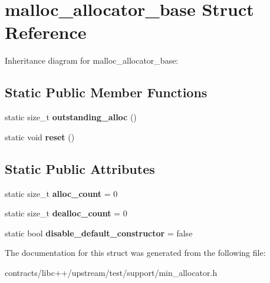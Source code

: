 \hypertarget{structmalloc__allocator__base}{}\section{malloc\+\_\+allocator\+\_\+base Struct Reference}
\label{structmalloc__allocator__base}


Inheritance diagram for malloc\+\_\+allocator\+\_\+base\+:
\subsection*{Static Public Member Functions}
\begin{DoxyCompactItemize}
\item 
\mbox{\label{structmalloc__allocator__base_a3427afcf9434416b9a1b515e244ca60f}} 
static size\+\_\+t {\bfseries outstanding\+\_\+alloc} ()
\item 
\mbox{\label{structmalloc__allocator__base_a7f3e6ab825b526a4f5fdb63b6d248fd3}} 
static void {\bfseries reset} ()
\end{DoxyCompactItemize}
\subsection*{Static Public Attributes}
\begin{DoxyCompactItemize}
\item 
\mbox{\label{structmalloc__allocator__base_afb84027cfe84072b009c13367ae7f69e}} 
static size\+\_\+t {\bfseries alloc\+\_\+count} = 0
\item 
\mbox{\label{structmalloc__allocator__base_a38f8564cc929bda224dcaa9dd87fe0d0}} 
static size\+\_\+t {\bfseries dealloc\+\_\+count} = 0
\item 
\mbox{\label{structmalloc__allocator__base_adc4ad9b7a89dd479d1176a4111096b28}} 
static bool {\bfseries disable\+\_\+default\+\_\+constructor} = false
\end{DoxyCompactItemize}


The documentation for this struct was generated from the following file\+:\begin{DoxyCompactItemize}
\item 
contracts/libc++/upstream/test/support/min\+\_\+allocator.\+h\end{DoxyCompactItemize}

